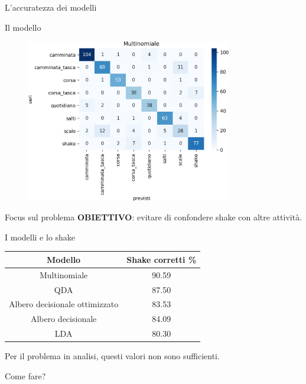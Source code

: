 \documentclass{beamer}
\begin{document}
\begin{frame}{L'accuratezza dei modelli}

\end{frame}


\begin{frame}{Il modello}
\begin{figure}[H]
\includegraphics[width=0.8\textwidth]{../figure/confusionMatrix-Mn.png}
\end{figure}
\end{frame}

\begin{frame}{Focus sul problema}
\textbf{OBIETTIVO}: evitare di confondere shake con altre attività.

\end{frame}

\begin{frame}{I modelli e lo shake}
\begin{table}[H]
\begin{tabular}{cc}
\toprule
Modello & Shake corretti \% \\
\midrule
Multinomiale & 90.59\\
QDA & 87.50\\
Albero decisionale ottimizzato & 83.53\\
Albero decisionale & 84.09\\
LDA & 80.30\\
\bottomrule
\end{tabular}
\end{table}

Per il problema in analisi, questi valori non sono sufficienti. 

Come fare?
\end{frame}
\end{document}
